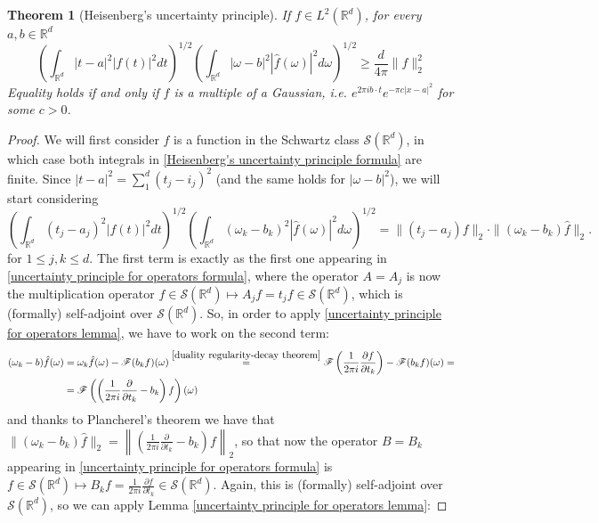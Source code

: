 \documentclass[corpo=11pt, stile=classica, tipotesi=custom,
greek, evenboxes, english]{toptesi}
\numberwithin{equation}{chapter}
\newtheorem{teo}{Theorem}[chapter] %
\theoremstyle{remark}
\newcommand{\R}{\mathbb{R}} %
\newcommand{\F}{\mathscr{F}} %
\newcommand{\pdfrac}[2]{\dfrac{\partial #1}{\partial #2}}
\newcommand{\pfrac}[2]{\frac{\partial #1}{\partial #2}}
\begin{document}
\begin{teo}[Heisenberg's uncertainty principle]\label{Heisenberg's uncertainty principle theorem}
	If $f \in L^2(\R^d)$, for every $a,b \in \R^d$
	\begin{equation}\label{Heisenberg's uncertainty principle formula}
		\left(\int_{\R^d}|t-a|^2 |f(t)|^2 dt\right)^{1/2} \left(\int_{\R^d} |\omega-b|^2 |\hat{f}(\omega)|^2 d\omega\right)^{1/2} \geq \dfrac{d}{4\pi}\| f \|_2^2
	\end{equation}
	Equality holds if and only if $f$ is a multiple of a Gaussian, i.e. $e^{2 \pi i b \cdot t}e^{-\pi c |x-a|^2}$ for some $c > 0$.
\end{teo}
\begin{proof}
	We will first consider $f$ is a function in the Schwartz class $\mathcal{S}(\R^d)$, in which case both integrals in \eqref{Heisenberg's uncertainty principle formula} are finite. Since $|t-a|^2 = \sum_1^d (t_j-i_j)^2$ (and the same holds for $|\omega-b|^2$), we will start considering
	\begin{equation*}
		\left(\int_{\R^d}(t_j-a_j)^2 |f(t)|^2 dt\right)^{1/2} \left(\int_{\R^d} (\omega_k-b_k)^2 |\hat{f}(\omega)|^2 d\omega\right)^{1/2} = \| (t_j-a_j)f\|_2 \cdot \| (\omega_k-b_k)\hat{f}\|_2.
	\end{equation*}
	for $1 \leq j,k \leq d$. The first term is exactly as the first one appearing in \eqref{uncertainty principle for operators formula}, where the operator $A=A_j$ is now the multiplication operator $f \in \mathcal{S}(\R^d) \mapsto A_jf = t_j f \in \mathcal{S}(\R^d)$, which is {\color{red} (formally)} self-adjoint over $\mathcal{S}(\R^d)$. So, in order to apply \ref{uncertainty principle for operators lemma}, we have to work on the second term:
	\begin{align*}
		(\omega_k - b) \hat{f}(\omega) &= \omega_k \hat{f}(\omega) - \F(b_k f)(\omega) \overset{\ref{duality regularity-decay theorem}}{=} \F \left(\dfrac{1}{2\pi i}\pdfrac{f}{t_k}\right) - \F(b_k f)(\omega) =\\
									   &= \F \left( \left(\dfrac{1}{2\pi i}\pdfrac{}{t_k} - b_k\right)f\right)(\omega)
	\end{align*}
	and thanks to Plancherel's theorem we have that $\|(\omega_k-b_k)\hat{f}\|_2 = \left\| \left(\frac{1}{2\pi i}\pfrac{}{t_k} - b_k\right)f\right\|_2$, so that now the operator $B=B_k$ appearing in \eqref{uncertainty principle for operators formula} is $f \in \mathcal{S}(\R^d) \mapsto B_kf = \frac{1}{2\pi i}\pfrac{f}{t_k} \in \mathcal{S}(\R^d)$. Again, this is {\color{red} (formally)} self-adjoint over $\mathcal{S}(\R^d)$, so we can apply Lemma \ref{uncertainty principle for operators lemma}:

\end{proof}
\end{document}
